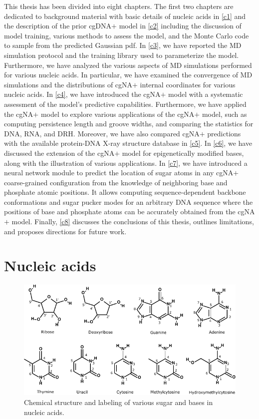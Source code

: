 This thesis has been divided into eight chapters. 
The first two chapters are dedicated to background material with basic details of nucleic acids in \cref{c1} and the description of the prior cgDNA$+$ model in \cref{c2} including the discussion of model training, various methods to assess the model, and the Monte Carlo code to sample from the predicted Gaussian pdf. 
In \cref{c3}, we have reported the MD simulation protocol and the training library used to parameterize the model. 
Furthermore, we have analyzed the various aspects of MD simulations performed for various nucleic acids.
In particular, we have examined the convergence of MD simulations and the distributions of cgNA$+$ internal coordinates for various nucleic acids. 
In \cref{c4}, we have introduced the cgNA$+$ model with a systematic assessment of the model's predictive capabilities.
Furthermore, we have applied the cgNA$+$ model to explore various applications of the cgNA$+$ model, such as computing persistence length and groove widths, and comparing the statistics for DNA, RNA, and DRH.
Moreover, we have also compared cgNA$+$ predictions with the available protein-DNA X-ray structure database in \cref{c5}.
In \cref{c6}, we have discussed the extension of the cgNA$+$ model for epigenetically modified bases, along with the illustration of various applications.
In \cref{c7}, we have introduced a neural network module to predict the location of sugar atoms in any cgNA$+$ coarse-grained configuration from the knowledge of neighboring base and phosphate atomic positions.
It allows computing sequence-dependent backbone conformations and sugar pucker modes for an arbitrary DNA sequence where the positions of base and phosphate atoms can be accurately obtained from the cgNA$+$ model.
Finally, \cref{c8} discusses the conclusions of this thesis, outlines limitations, and proposes directions for future work. 

\section{Nucleic acids}\label{c1:s2}
\begin{figure}[htb]
	\begin{center}
	\centering\includegraphics[scale=1.1]{images/combine_bases_final.pdf}
	\centering\caption{Chemical structure and labeling of various sugar and bases in nucleic acids.}
\label{c1:fig1}
\end{center}
\end{figure}


